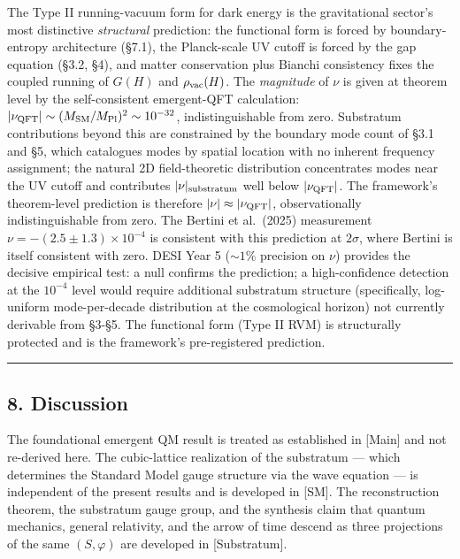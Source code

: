 \documentclass[
]{article}
\begin{document}
The Type II running-vacuum form for dark energy is the gravitational
sector's most distinctive \emph{structural} prediction: the functional
form is forced by boundary-entropy architecture (§7.1), the Planck-scale
UV cutoff is forced by the gap equation (§3.2, §4), and matter
conservation plus Bianchi consistency fixes the coupled running of
\(G(H)\) and \(\rho_{\rm vac}(H)\). The \emph{magnitude} of \(\nu\) is
given at theorem level by the self-consistent emergent-QFT calculation:
\(|\nu_{\rm QFT}| \sim (M_{\rm SM}/M_{\rm Pl})^2 \sim 10^{-32}\),
indistinguishable from zero. Substratum contributions beyond this are
constrained by the boundary mode count of §3.1 and §5, which catalogues
modes by spatial location with no inherent frequency assignment; the
natural 2D field-theoretic distribution concentrates modes near the UV
cutoff and contributes \(|\nu|_{\rm substratum}\) well below
\(|\nu_{\rm QFT}|\). The framework's theorem-level prediction is
therefore \(|\nu| \approx |\nu_{\rm QFT}|\), observationally
indistinguishable from zero. The Bertini et al.~(2025) measurement
\(\nu = -(2.5 \pm 1.3) \times 10^{-4}\) is consistent with this
prediction at \(2\sigma\), where Bertini is itself consistent with zero.
DESI Year 5 (\(\sim 1\%\) precision on \(\nu\)) provides the decisive
empirical test: a null confirms the prediction; a high-confidence
detection at the \(10^{-4}\) level would require additional substratum
structure (specifically, log-uniform mode-per-decade distribution at the
cosmological horizon) not currently derivable from §3-§5. The functional
form (Type II RVM) is structurally protected and is the framework's
pre-registered prediction.

\begin{center}\rule{0.5\linewidth}{0.5pt}\end{center}

\hypertarget{discussion}{%
\subsection{8. Discussion}\label{discussion}}

The foundational emergent QM result is treated as established in
{[}Main{]} and not re-derived here. The cubic-lattice realization of the
substratum --- which determines the Standard Model gauge structure via
the wave equation --- is independent of the present results and is
developed in {[}SM{]}. The reconstruction theorem, the substratum gauge
group, and the synthesis claim that quantum mechanics, general
relativity, and the arrow of time descend as three projections of the
same \((S, \varphi)\) are developed in {[}Substratum{]}.
\end{document}
